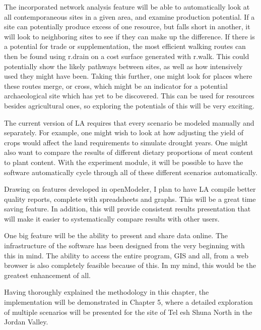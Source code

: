 The incorporated network analysis feature will be able to automatically look at all contemporaneous sites in a given area, and examine production potential. If a site can potentially produce excess of one resource, but falls short in another, it will look to neighboring sites to see if they can make up the difference.  If there is a potential for trade or supplementation, the most efficient walking routes can then be found using r.drain on a cost surface generated with r.walk. This could potentially show the likely pathways between sites, as well as how intensively used they might have been. Taking this further, one might look for places where these routes merge, or cross, which might be an indicator for a potential archaeological site which has yet to be discovered.  This can be used for resources besides agricultural ones, so exploring the potentials of this will be very exciting.

The current version of LA requires that every scenario be modeled manually and separately. For example, one might wish to look at how adjusting the yield of crops would affect the land requirements to simulate drought years. One might also want to compare the results of different dietary proportions of meat content to plant content. With the experiment module, it will be possible to have the software automatically cycle through all of these different scenarios automatically.

Drawing on features developed in openModeler, I plan to have LA compile better quality reports, complete with spreadsheets and graphs. This will be a great time saving feature.  In addition, this will provide consistent results presentation that will make it easier to systematically compare results with other users.

One big feature will be the ability to present and share data online.  The infrastructure of the software has been designed from the very beginning with this in mind.  The ability to access the entire program, GIS and all, from a web browser is also completely feasible because of this.  In my mind, this would be the greatest enhancement of all.

Having thoroughly explained the methodology in this chapter, the implementation will be demonstrated in Chapter 5, where a detailed exploration of multiple scenarios will be presented for the site of Tel esh Shuna North in the Jordan Valley.